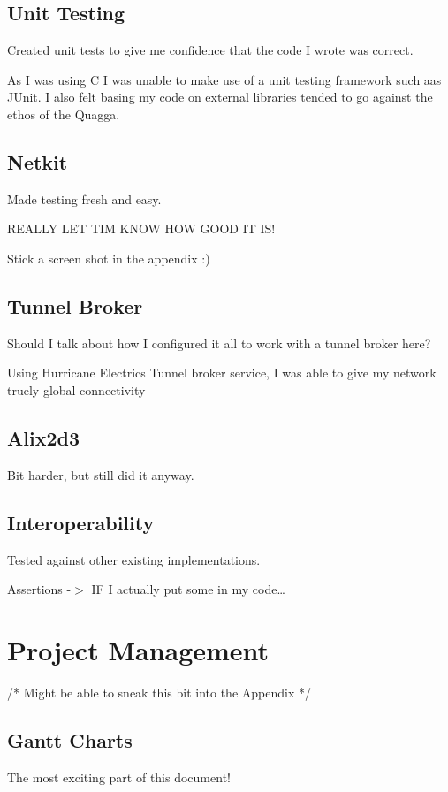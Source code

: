 \documentclass[12pt]{report}
\begin{document}
\section{Unit Testing}
Created unit tests to give me confidence that the code I wrote was correct. 

As I was using C I was unable to make use of a unit testing framework such aas 
JUnit. I also felt basing my code on external libraries tended to go against the 
ethos of the Quagga.

\section{Netkit} 
Made testing fresh and easy. 

REALLY LET TIM KNOW HOW GOOD IT IS!

Stick a screen shot in the appendix :)

\section{Tunnel Broker}
Should I talk about how I configured it all to work with a tunnel broker here?

Using Hurricane Electrics Tunnel broker service, I was able to give my network
truely global connectivity

\section{Alix2d3}
Bit harder, but still did it anyway.

\section{Interoperability}

Tested against other existing implementations.

Assertions -$>$ IF I actually put some in my code\ldots

\chapter{Project Management}
/* Might be able to sneak this bit into the Appendix */

\section{Gantt Charts}
The most exciting part of this document!
\end{document}
